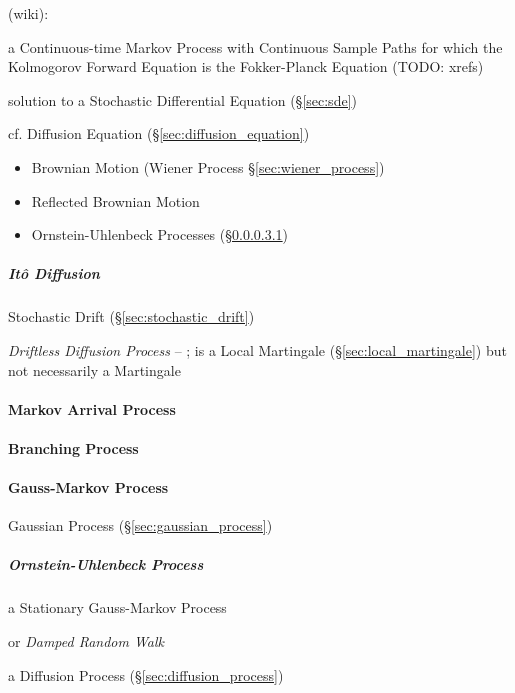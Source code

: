 (wiki):

a Continuous-time Markov Process with Continuous Sample Paths for which the
Kolmogorov Forward Equation is the Fokker-Planck Equation (TODO: xrefs)

solution to a Stochastic Differential Equation (\S\ref{sec:sde})

cf. Diffusion Equation (\S\ref{sec:diffusion_equation})

\begin{itemize}
  \item Brownian Motion (Wiener Process \S\ref{sec:wiener_process})
  \item Reflected Brownian Motion
  \item Ornstein-Uhlenbeck Processes (\S\ref{sec:ornstein_uhlenbeck})
\end{itemize}



\subparagraph{It\^o Diffusion}\label{sec:ito_diffusion}\hfill

Stochastic Drift (\S\ref{sec:stochastic_drift})

\emph{Driftless Diffusion Process} -- ; is a Local Martingale
(\S\ref{sec:local_martingale}) but not necessarily a Martingale



\paragraph{Markov Arrival Process}\label{sec:markov_arrival_process}\hfill

\paragraph{Branching Process}\label{sec:branching_process}\hfill

\paragraph{Gauss-Markov Process}\label{sec:gauss_markov_process}\hfill

Gaussian Process (\S\ref{sec:gaussian_process})



\subparagraph{Ornstein-Uhlenbeck Process}\label{sec:ornstein_uhlenbeck}\hfill

a Stationary Gauss-Markov Process

or \emph{Damped Random Walk}

a Diffusion Process (\S\ref{sec:diffusion_process})



